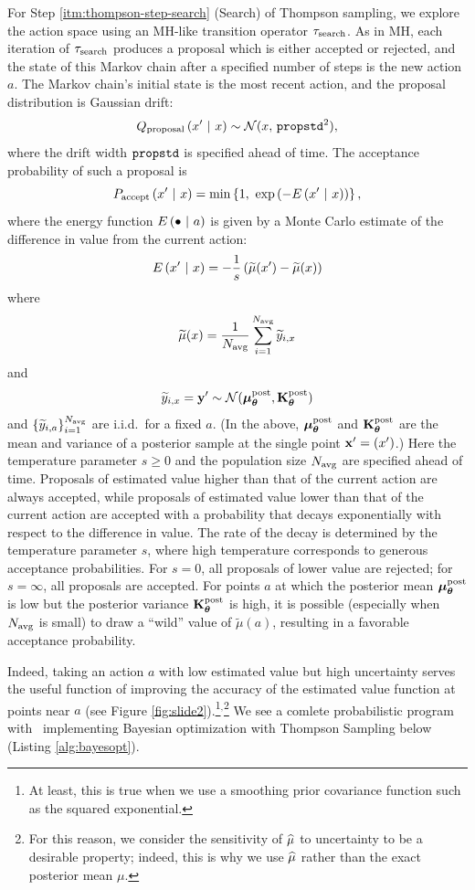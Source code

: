 For Step \ref{itm:thompson-step-search} (Search) of Thompson sampling, we
explore the action space using an MH-like transition operator $\tau_{\textrm{search}}$.
As in MH, each iteration of $\tau_{\textrm{search}}$ produces a proposal which is either
accepted or rejected, and the state of this Markov chain after a specified
number of steps is the new action $a$.  The Markov chain's initial state is the
most recent action, and the proposal distribution is Gaussian drift:
\[ Q_{\textrm{proposal}}\left( x' \ \middle\vert\  x \right) \sim \mathcal{N}(x,\,\texttt{propstd}^2), \]
where the drift width $\texttt{propstd}$ is specified ahead of time.  The acceptance
probability of such a proposal is
\[ P_\accept\pn{x' \mvert x} = \min\br{1,\ \exp\pn{-E\pn{x' \mvert x}}}, \]
where the energy function $E\left( \bullet \ \middle\vert\  a \right)$ is given by a Monte Carlo
estimate of the difference in value from the current action:
\[ E\left( x' \ \middle\vert\  x \right) = -\frac1s \left( \widetilde{\mu}(x') - \widetilde{\mu}(x) \right) \]
where
\[ \widetilde{\mu}(x) = \frac{1}{N_{\textrm{avg}}} \sum_{i=1}^{N_{\textrm{avg}}} \widetilde{y}_{i,x} \]
and
\[ \widetilde{y}_{i,x}=\mathbf{y}^\prime \sim \mathcal{N}(\bm{\mu}_{\bm{\theta}}^\text{post}, \mathbf{K}_{\bm{\theta}}^\text{post}) \]
and $\left\{ \widetilde{y}_{i,a} \right\}_{i=1}^{N_{\textrm{avg}}}$ are i.i.d.\ for a fixed $a$.
(In the above, $\bm{\mu}_{\bm{\theta}}^\text{post}$ and $\mathbf{K}_{\bm{\theta}}^\text{post}$ are the mean and variance of a posterior
sample at the single point $\mathbf{x}^\prime = (x^\prime)$.)
Here the temperature parameter $s \geq 0$ and the population size $N_{\textrm{avg}}$ are
specified ahead of time.  Proposals of estimated value higher than that of the current action are
always accepted, while proposals of estimated value lower than that of the
current action are accepted with a probability that decays exponentially
with respect to the difference in value.
The rate of the decay is determined by the temperature parameter $s$,
where high temperature corresponds to generous acceptance probabilities.
For $s=0$, all proposals of lower value are rejected; for $s=\infty$, all
proposals are accepted.
For points $a$ at which the posterior mean $\bm{\mu}_{\bm{\theta}}^\text{post}$ is low but the
posterior variance $\mathbf{K}_{\bm{\theta}}^\text{post}$ is high, it is possible (especially when
$N_{\textrm{avg}}$ is small) to draw a ``wild'' value of $\widetilde{\mu}(a)$, resulting in a
favorable acceptance probability.



Indeed, taking an action $a$ with low estimated value but high uncertainty
serves the useful function of improving the accuracy of the estimated value
function at points near $a$ (see Figure \ref{fig:slide2}).\footnote{
  At least, this is true when we use a smoothing prior covariance function such
  as the squared exponential.
}$^,$\footnote{
  For this reason, we consider the sensitivity of $\widehat{\mu}$ to uncertainty to be
  a desirable property; indeed, this is why we use $\widehat{\mu}$ rather than the
  exact posterior mean $\mu$.
}
We see a comlete probabilistic program with \gpmem\ implementing Bayesian optimization
with Thompson Sampling below (Listing \ref{alg:bayesopt}).
 


